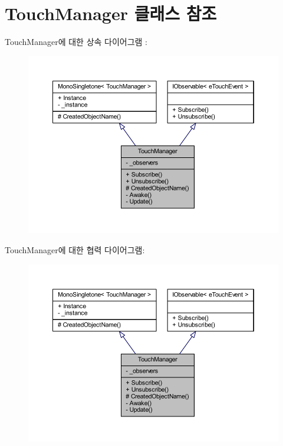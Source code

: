 \hypertarget{class_touch_manager}{}\section{Touch\+Manager 클래스 참조}
\label{class_touch_manager}


Touch\+Manager에 대한 상속 다이어그램 \+: \nopagebreak
\begin{figure}[H]
\begin{center}
\leavevmode
\includegraphics[width=350pt]{class_touch_manager__inherit__graph}
\end{center}
\end{figure}


Touch\+Manager에 대한 협력 다이어그램\+:\nopagebreak
\begin{figure}[H]
\begin{center}
\leavevmode
\includegraphics[width=350pt]{class_touch_manager__coll__graph}
\end{center}
\end{figure}
